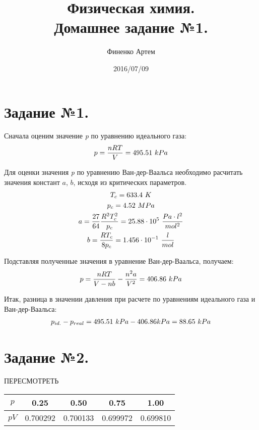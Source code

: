 \documentclass[a4paper]{article}
\title{Физическая химия.  \\ Домашнее задание №1.}
\author{Финенко Артем}
\date{2016/07/09}
\begin{document}
\maketitle

\section{Задание №1.}
Сначала оценим значение \textit{p} по уравнению идеального газа:
\begin{gather}
p = \frac{n R T}{V} = 495.51 \ kPa \notag
\end{gather}

Для оценки значения \textit{p} по уравнению Ван-дер-Ваальса необходимо расчитать значения констант $a$, $b$, исходя из критических параметров.
\begin{gather}
T_c = 633.4 \ K \notag \\
p_c = 4.52 \ MPa \notag \\ 
a = \frac{27}{64} \frac{R^2 T_c^2}{p_c} = 25.88 \cdot 10^5 \  \frac{Pa \cdot l^2}{mol^2} \notag \\
b = \frac{R T_c}{8 p_c} = 1.456 \cdot 10^{-1} \ \frac{l}{mol} \notag 
\end{gather}

Подставляя полученные значения в уравнение Ван-дер-Ваальса, получаем:
\begin{gather}
p = \frac{nRT}{V-nb} - \frac{n^2 a}{V^2} = 406.86 \ kPa \notag
\end{gather}

Итак, разница в значении давления при расчете по уравнениям идеального газа и Ван-дер-Ваальса:
\begin{gather}
p_{id.} - p_{real} = 495.51 \ kPa - 406.86 kPa = 88.65 \ kPa \notag
\end{gather}

\section{Задание №2.}

ПЕРЕСМОТРЕТЬ

\begin{center}
\begin{tabular}{|*5{c|}}
\hline
$p$ & 0.25 & 0.50 & 0.75 & 1.00 \\ \hline
$pV$ & 0.700292 & 0.700133 & 0.699972 & 0.699810 \\ \hline
\end{tabular}
\end{center}
\end{document}
